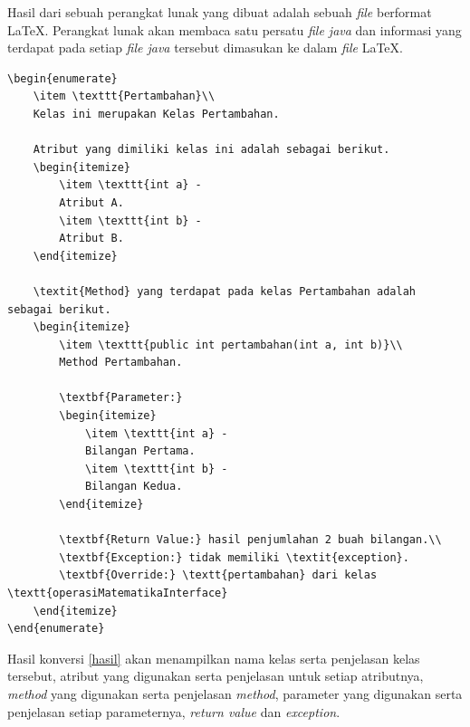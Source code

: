 \documentclass[a4paper,twoside]{article}
\begin{document}
\begin{enumerate}
\begin{enumerate}
Hasil dari sebuah perangkat lunak yang dibuat adalah sebuah {\it file} berformat \LaTeX. Perangkat lunak akan membaca satu persatu {\it file java} dan informasi yang terdapat pada setiap {\it file java} tersebut dimasukan ke dalam {\it file} \LaTeX.

\begin{lstlisting}[caption=Contoh hasil konversi {\it Javadoc} ke \LaTeX, label={hasil}]
\begin{enumerate}
	\item \texttt{Pertambahan}\\
	Kelas ini merupakan Kelas Pertambahan.
	
	Atribut yang dimiliki kelas ini adalah sebagai berikut.
	\begin{itemize}
		\item \texttt{int a} -
		Atribut A.
		\item \texttt{int b} -
		Atribut B.
	\end{itemize}
	
	\textit{Method} yang terdapat pada kelas Pertambahan adalah sebagai berikut.
	\begin{itemize}
		\item \texttt{public int pertambahan(int a, int b)}\\
		Method Pertambahan.
		
		\textbf{Parameter:}
		\begin{itemize}
			\item \texttt{int a} - 
			Bilangan Pertama.
			\item \texttt{int b} - 
			Bilangan Kedua.
		\end{itemize}
		
		\textbf{Return Value:} hasil penjumlahan 2 buah bilangan.\\
		\textbf{Exception:} tidak memiliki \textit{exception}.
		\textbf{Override:} \textt{pertambahan} dari kelas \textt{operasiMatematikaInterface}
	\end{itemize}
\end{enumerate}
\end{lstlisting}

Hasil konversi \ref{hasil} akan menampilkan nama kelas serta penjelasan kelas tersebut, atribut yang digunakan serta penjelasan untuk setiap atributnya, {\it method} yang digunakan serta penjelasan {\it method}, parameter yang digunakan serta penjelasan setiap parameternya, {\it return value} dan {\it exception}.


\end{enumerate}
\end{enumerate}
\end{document}
